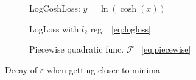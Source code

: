 \begin{figure}[H] \label{graph:eps_graphs}
\centering
\begin{subfigure}{0.3\textwidth}

\caption{LogCoshLoss: $y = \ln(\cosh(x))$ }
\end{subfigure}
\hfill
\begin{subfigure}{0.3\textwidth}

\caption{LogLoss with $l_2$ reg.  ~\eqref{eq:logloss}}
\end{subfigure}
\hfill
\begin{subfigure}{0.3\textwidth}

\caption{Piecewise quadratic func. $\mathcal{F} $ ~\eqref{eq:piecewise}}
\end{subfigure}


\caption{Decay of $\varepsilon$ when getting closer to minima}
\end{figure}